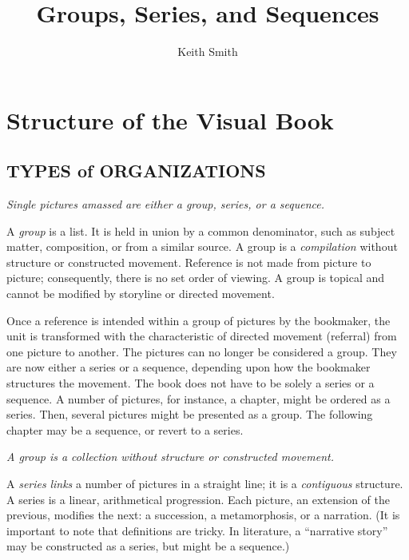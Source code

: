 \documentclass[12pt]{extarticle}
\title{\Huge Groups, Series, and Sequences}
\author{\Large Keith Smith}
\date{}
\begin{document}
\maketitle

\vspace{-2em}

\section*{Structure of the Visual Book}

\subsection*{TYPES of ORGANIZATIONS}

\begin{flushright}
\textit{Single pictures amassed are either a \emph{group,} \emph{series,} or a \emph{sequence.}}
\end{flushright}

A \textit{group} is a list. It is held in union by a common denominator, such as subject matter, composition, or from a similar source. A group is a \textit{compilation} without structure or constructed movement. Reference is not made from picture to picture; consequently, there is no set order of viewing. A group is topical and cannot be modified by storyline or directed movement.

Once a reference is intended within a group of pictures by the bookmaker, the unit is transformed with the characteristic of directed movement (referral) from one picture to another. The pictures can no longer be considered a group. They are now either a series or a sequence, depending upon how the bookmaker structures the movement. The book does not have to be solely a series or a sequence. A number of pictures, for instance, a chapter, might be ordered as a series. Then, several pictures might be presented as a group. The following chapter may be a sequence, or revert to a series.

\begin{flushright}
\textit{A group is a \emph{collection} without structure or constructed movement.}
\end{flushright}

A \textit{series} \textit{links} a number of pictures in a straight line; it is a \textit{contiguous} structure. A series is a linear, arithmetical progression. Each picture, an extension of the previous, modifies the next: a succession, a metamorphosis, or a narration. (It is important to note that definitions are tricky. In literature, a ``narrative story'' may be constructed as a series, but might be a sequence.)
\end{document}
